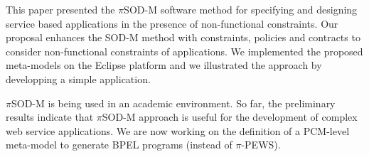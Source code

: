 This paper presented the $\pi$SOD-M software method for specifying and designing service based applications in the presence of  non-functional constraints. 
Our proposal enhances the SOD-M method with constraints, policies and contracts  to consider non-functional constraints of applications.
We implemented the proposed meta-models on the Eclipse platform and we illustrated the approach by developping a simple application.

$\pi$SOD-M is being used in an academic environment.
So far, the preliminary results indicate that $\pi$SOD-M approach is useful for the development of complex web service applications. 
We are now working on the definition of a PCM-level meta-model to generate BPEL programs (instead of $\pi$-PEWS). 
